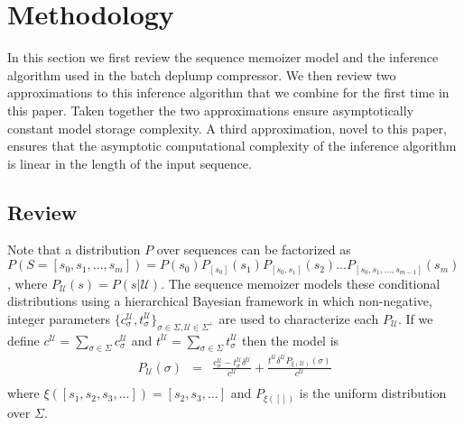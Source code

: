 \section{Methodology}
\newcommand{\T}{\ensuremath{\mathcal{T}}}
\newcommand{\N}{\ensuremath{\mathcal{N}}}
\newcommand{\M}{\ensuremath{\mathcal{M}}}
\newcommand{\PP}{\ensuremath{\mathcal{P}}}
\newcommand{\nc}{\ensuremath{nc}}
\newcommand{\RS}{\ensuremath{\mathcal{R}}}
\newcommand{\D}{\ensuremath{\mathcal{D}}}
\newcommand{\la}{\ensuremath{\leftarrow}}
\newcommand{\G}{\ensuremath{\mathcal{G}}}
\newcommand{\IS}{\ensuremath{\mathcal{I}}}
\newcommand{\Seq}{\ensuremath{\mathcal{S}}}
\newcommand{\dd}{\ensuremath{\delta}}
\newcommand{\U}{\mathcal{U}}
\label{section:methodology}

In this section we first review the sequence memoizer model and the inference algorithm used in the batch deplump compressor. We then review two approximations to this inference algorithm that we combine for the first time in this paper.  Taken together the two approximations ensure asymptotically constant model storage complexity.  A third approximation, novel to this paper, ensures that the asymptotic computational complexity of the inference algorithm is linear in the length of the input sequence.

\subsection{Review}

Note that a distribution $P$ over sequences can be factorized as $P(S = [s_0, s_1, \ldots, s_m]) = P(s_0)P_{[s_0]}(s_1)P_{[s_0,s_1]}(s_2) \ldots P_{[s_0,s_1,\ldots,s_{m-1}]}(s_m)$, where $P_\U (s) = P(s | \U)$.  The sequence memoizer \citep{Wood2009} models these conditional distributions using a hierarchical Bayesian framework in which non-negative, integer parameters $\{ c^\U_\sigma, t^\U_\sigma \}_{\sigma \in \Sigma, \U \in \Sigma^{+}}$ are used to characterize each $P_\U$.  If we define $c^\U = \sum_{\sigma \in \Sigma} c^\U_\sigma$ and $t^\U = \sum_{\sigma \in \Sigma} t^\U_\sigma$ then the model is
%
\begin{eqnarray*}
	P_\U(\sigma) &=& \frac{c^\U_\sigma - t^\U_\sigma \delta^\U}{c^\U} +  \frac{t^\U \delta^\U  P_{ \xi(\U)}(\sigma) }{c^\U} \\
\end{eqnarray*}
%
\noindent where $\xi([s_1, s_2, s_3, \ldots]) = [s_2,s_3, \ldots]$ and $P_{\xi([])}$ is the uniform distribution over $\Sigma$.

